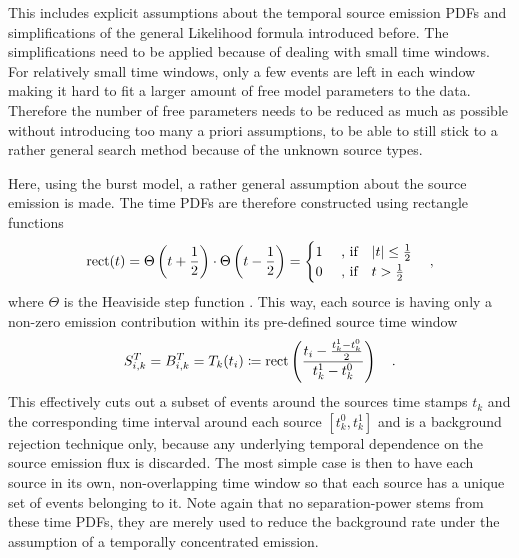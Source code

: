 This includes explicit assumptions about the temporal source emission PDFs and simplifications of the general Likelihood formula introduced before.
The simplifications need to be applied because of dealing with small time windows.
For relatively small time windows, only a few events are left in each window making it hard to fit a larger amount of free model parameters to the data.
Therefore the number of free parameters needs to be reduced as much as possible without introducing too many a priori assumptions, to be able to still stick to a rather general search method because of the unknown source types.

Here, using the burst model, a rather general assumption about the source emission is made.
The time PDFs are therefore constructed using rectangle functions
\begin{equation}
  \operatorname{rect}(t)
  = \Theta\left(t+\frac{1}{2}\right) \cdot \Theta\left(t-\frac{1}{2}\right)
  = \begin{cases}
      1 &\text{ , if}\quad |t| \leq \frac{1}{2} \\
      0 &\text{ , if}\quad  t    >  \frac{1}{2} \\
    \end{cases}
  \quad\text{,}
\end{equation}
where $\Theta$ is the Heaviside step function .
This way, each source is having only a non-zero emission contribution within its pre-defined source time window
\begin{equation}
  \label{equ:time_window_def}
  S_{i,k}^T = B_{i,k}^T = T_k(t_i) \coloneqq
    \operatorname{rect}\left(\frac{t_i - \frac{t_k^1-t_k^0}{2}}
                              {t_k^1-t_k^0}\right)
  \quad\text{.}
\end{equation}
This effectively cuts out a subset of events around the sources time stamps $t_k$ and the corresponding time interval around each source $[t_k^0, t_k^1]$ and is a background rejection technique only, because any underlying temporal dependence on the source emission flux is discarded.
The most simple case is then to have each source in its own, non-overlapping time window so that each source has a unique set of events belonging to it.
Note again that no separation-power stems from these time PDFs, they are merely used to reduce the background rate under the assumption of a temporally concentrated emission.

